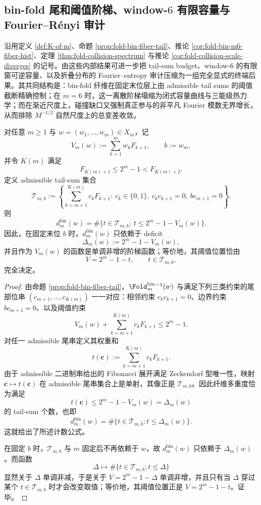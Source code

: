 \subsection{bin-fold 尾和阈值阶梯、window-\texorpdfstring{$6$}{6} 有限容量与 Fourier--R\'enyi 审计}\label{subsec:conclusion-foldbin-tail-capacity-fourier-renyi-audit}
沿用定义 \ref{def:K-of-m}、命题 \ref{prop:fold-bin-fiber-tail}、推论 \ref{cor:fold-bin-m6-fiber-hist}、定理 \ref{thm:fold-collision-spectrum} 与推论 \ref{cor:fold-collision-scale-diverges} 的记号。由这些内部结果可进一步把 tail-sum budget、window-\(6\) 的有限窗可逆容量、以及折叠分布的 Fourier--entropy 审计压缩为一组完全显式的终端后果。其共同结构是：bin-fold 纤维在固定末位层上由 admissible tail sums 的阈值截断精确控制；在 \(m=6\) 时，这一离散阶梯塌缩为闭式容量曲线与三能级热力学；而在渐近尺度上，碰撞缺口又强制真正参与的非平凡 Fourier 模数无界增长，从而排除 \(M^{-1/2}\) 自然尺度上的总变差收敛。

\begin{theorem}\label{thm:conclusion-foldbin-tail-sum-threshold-staircase}
对任意 \(m\ge 1\) 与 \(w=(w_1,\dots,w_m)\in X_m\)，记
\[
V_m(w):=\sum_{k=1}^{m}w_kF_{k+1},
\qquad
b:=w_m,
\]
并令 \(K(m)\) 满足
\[
F_{K(m)+1}\le 2^m-1<F_{K(m)+2}.
\]
定义 admissible tail-sum 集合
\[
\mathcal T_{m,b}
:=
\left\{
\sum_{k=m+1}^{K(m)}c_kF_{k+1}:\ 
c_k\in\{0,1\},\ 
c_kc_{k+1}=0,\ 
bc_{m+1}=0
\right\}.
\]
则
\[
\boxed{\;
d_m^{\mathrm{bin}}(w)
=
\#\bigl\{t\in \mathcal T_{m,b}:\
t\le 2^m-1-V_m(w)\bigr\}.\;}
\]
因此，在固定末位 \(b\) 时，\(d_m^{\mathrm{bin}}(w)\) 只依赖于 deficit
\[
\Delta_m(w):=2^m-1-V_m(w),
\]
并且作为 \(V_m(w)\) 的函数是单调非增的阶梯函数；等价地，其阈值位置恰由
\[
V=2^m-1-t,
\qquad t\in\mathcal T_{m,b},
\]
完全决定。
\end{theorem}
\begin{proof}
由命题 \ref{prop:fold-bin-fiber-tail}，\(\Fold_m^{\mathrm{bin}}{}^{-1}(w)\) 与满足下列三类约束的尾部位串 \((c_{m+1},\dots,c_{K(m)})\) 一一对应：相邻约束 \(c_kc_{k+1}=0\)、边界约束 \(bc_{m+1}=0\)、以及阈值约束
\[
V_m(w)+\sum_{k=m+1}^{K(m)}c_kF_{k+1}\le 2^m-1.
\]
对任一 admissible 尾串定义其权重和
\[
t(\mathbf c):=\sum_{k=m+1}^{K(m)}c_kF_{k+1}.
\]
由于 admissible 二进制串给出的 Fibonacci 展开满足 Zeckendorf 型唯一性，映射 \(\mathbf c\mapsto t(\mathbf c)\) 在 admissible 尾串集合上是单射，其像正是 \(\mathcal T_{m,b}\)。因此纤维多重度恰为满足
\[
t(\mathbf c)\le 2^m-1-V_m(w)=\Delta_m(w)
\]
的 tail-sum 个数，也即
\[
d_m^{\mathrm{bin}}(w)
=
\#\bigl\{t\in \mathcal T_{m,b}:t\le \Delta_m(w)\bigr\}.
\]
这就给出了所述计数公式。

在固定 \(b\) 时，\(\mathcal T_{m,b}\) 与 \(m\) 固定后不再依赖于 \(w\)，故 \(d_m^{\mathrm{bin}}(w)\) 只依赖于 \(\Delta_m(w)\)。而函数
\[
\Delta\longmapsto \#\bigl\{t\in \mathcal T_{m,b}:t\le \Delta\bigr\}
\]
显然关于 \(\Delta\) 单调非减，于是关于 \(V=2^m-1-\Delta\) 单调非增，并且只有当 \(\Delta\) 穿过某个 \(t\in\mathcal T_{m,b}\) 时才会改变取值；等价地，其阈值位置正是 \(V=2^m-1-t\)。证毕。
\end{proof}

